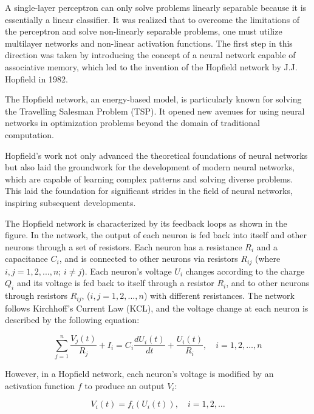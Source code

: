 \documentclass[paper=a4, fontsize=11pt]{scrartcl} %
\numberwithin{equation}{section} %
\numberwithin{figure}{section} %
\numberwithin{table}{section} %
\begin{document}
A single-layer perceptron can only solve problems linearly separable because it is essentially a linear classifier. It was realized that to overcome the limitations of the perceptron and solve non-linearly separable problems, one must utilize multilayer networks and non-linear activation functions. The first step in this direction was taken by introducing the concept of a neural network capable of associative memory, which led to the invention of the Hopfield network by J.J. Hopfield in 1982.

The Hopfield network, an energy-based model, is particularly known for solving the Travelling Salesman Problem (TSP). It opened new avenues for using neural networks in optimization problems beyond the domain of traditional computation.

Hopfield's work not only advanced the theoretical foundations of neural networks but also laid the groundwork for the development of modern neural networks, which are capable of learning complex patterns and solving diverse problems. This laid the foundation for significant strides in the field of neural networks, inspiring subsequent developments.

The Hopfield network is characterized by its feedback loops as shown in the figure. In the network, the output of each neuron is fed back into itself and other neurons through a set of resistors. Each neuron has a resistance \( R_i \) and a capacitance \( C_i \), and is connected to other neurons via resistors \( R_{ij} \) (where \( i,j = 1,2,...,n \); \( i \neq j \)). Each neuron's voltage \( U_i \) changes according to the charge \( Q_i \) and its voltage is fed back to itself through a resistor \( R_i \), and to other neurons through resistors \( R_{ij} \), (\( i,j = 1,2,...,n \)) with different resistances. The network follows Kirchhoff's Current Law (KCL), and the voltage change at each neuron is described by the following equation:

\begin{equation}
    \sum_{j=1}^{n} \frac{V_j(t)}{R_j} + I_i = C_i \frac{dU_i(t)}{dt} + \frac{U_i(t)}{R_i}, \quad i = 1, 2, \ldots, n
\end{equation}

However, in a Hopfield network, each neuron's voltage is modified by an activation function \( f \) to produce an output \( V_i \):

\begin{equation}
    V_i(t) = f_i(U_i(t)), \quad i = 1, 2, \ldots
\end{equation}
\end{document}
